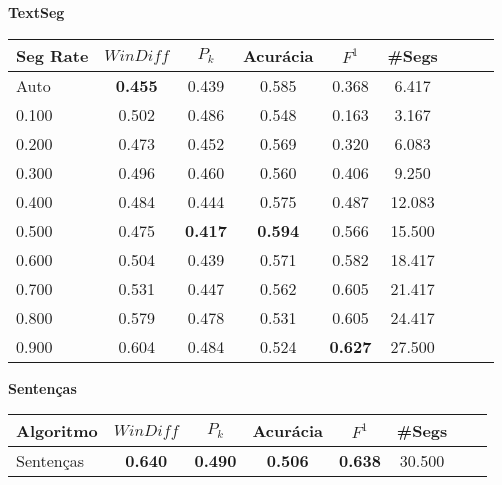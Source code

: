 \documentclass{article}
\begin{document}


{  
\large
\center
	\textbf{TextSeg}  

}

 \begin{longtable}[c]{|l|c|c|c|c|c|c|c|c|} 
\hline 
Seg Rate & $WinDiff$ & $P_k$ & Acurácia & $F^1$ & \#Segs\\ \hline 
Auto & \cellcolor{gray!20} \textbf{0.455} & 0.439 & 0.585 & 0.368 & 6.417  \\ \hline 
0.100 & 0.502 & 0.486 & 0.548 & 0.163 & 3.167  \\ \hline 
0.200 & 0.473 & 0.452 & 0.569 & 0.320 & 6.083  \\ \hline 
0.300 & 0.496 & 0.460 & 0.560 & 0.406 & 9.250  \\ \hline 
0.400 & 0.484 & 0.444 & 0.575 & 0.487 & 12.083  \\ \hline 
0.500 & 0.475 & \cellcolor{gray!20} \textbf{0.417} & \cellcolor{gray!20} \textbf{0.594} & 0.566 & 15.500  \\ \hline 
0.600 & 0.504 & 0.439 & 0.571 & 0.582 & 18.417  \\ \hline 
0.700 & 0.531 & 0.447 & 0.562 & 0.605 & 21.417  \\ \hline 
0.800 & 0.579 & 0.478 & 0.531 & 0.605 & 24.417  \\ \hline 
0.900 & 0.604 & 0.484 & 0.524 & \cellcolor{gray!20} \textbf{0.627} & 27.500  \\ \hline 
 \end{longtable} 





{  
\large
\center
	\textbf{Sentenças}  

}

\begin{longtable}[c]{|l|c|c|c|c|c|c|c|} 
\hline 
Algoritmo & $WinDiff$ & $P_k$ & Acurácia & $F^1$ & \#Segs\\ \hline 
Sentenças & \cellcolor{gray!20} \textbf{0.640} & \cellcolor{gray!20} \textbf{0.490} & \cellcolor{gray!20} \textbf{0.506} & \cellcolor{gray!20} \textbf{0.638} & 30.500  \\ \hline 
 \end{longtable} 
\end{document}

